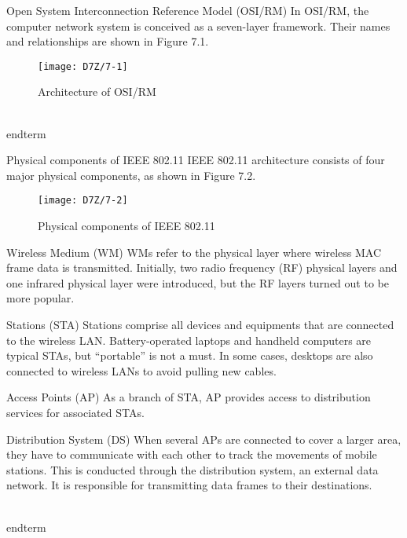\documentclass[a4paper,12pt]{book}
\begin{document}
\begin{term}{Open System Interconnection Reference Model (OSI/RM)}
    In OSI/RM, the computer network system is conceived as a seven-layer framework. Their names and relationships are shown in Figure 7.1.

    \begin{figure}[!h]
        \centering
        \texttt{[image: D7Z/7-1]}
        \caption{Architecture of OSI/RM}
    \end{figure}
\\end{term}{}

\begin{term}{Physical components of IEEE 802.11}
    IEEE 802.11 architecture consists of four major physical components, as shown in Figure 7.2.

    \begin{figure}[!h]
        \centering
        \texttt{[image: D7Z/7-2]}
        \caption{Physical components of IEEE 802.11}
    \end{figure}

    \parskip 6pt
    \begin{secterm}{Wireless Medium (WM)}
        WMs refer to the physical layer where wireless MAC frame data is transmitted. Initially, two radio frequency (RF) physical layers and one infrared physical layer were introduced, but the RF layers turned out to be more popular.
    \end{secterm}

    \begin{secterm}{Stations (STA)}
        Stations comprise all devices and equipments that are connected to the wireless LAN. Battery-operated laptops and handheld computers are typical STAs, but “portable” is not a must. In some cases, desktops are also connected to wireless LANs to avoid pulling new cables.
    \end{secterm}

    \begin{secterm}{Access Points (AP)}
        As a branch of STA, AP provides access to distribution services for associated STAs.
    \end{secterm}

    \begin{secterm}{Distribution System (DS)}
        When several APs are connected to cover a larger area, they have to communicate with each other to track the movements of mobile stations. This is conducted through the distribution system, an external data network. It is responsible for transmitting data frames to their destinations.
    \end{secterm}
\\end{term}{}


\end{term}
\end{term}
\end{document}
